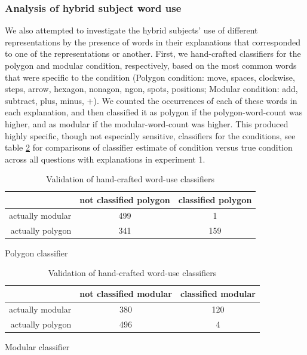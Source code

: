\documentclass[11pt]{article}
\begin{document}
\subsubsection{Analysis of hybrid subject word use}
We also attempted to investigate the hybrid subjects' use of different representations by the presence of words in their explanations that corresponded to one of the representations or another. First, we hand-crafted classifiers for the polygon and modular condition, respectively, based on the most common words that were specific to the condition (Polygon condition: move, spaces, clockwise, steps, arrow, hexagon, nonagon, ngon, spots, positions; Modular condition: add, subtract, plus, minus, +). We counted the occurrences of each of these words in each explanation, and then classified it as polygon if the polygon-word-count was higher, and as modular if the modular-word-count was higher. This produced highly specific, though not especially sensitive, classifiers for the conditions, see table \ref{wordusevaltable} for comparisons of classifier estimate of condition versus true condition across all questions with explanations in experiment 1. 
\begin{table}[h] 
\centering
    \begin{subtable}[c]{\textwidth}
	\centering
	\begin{tabular}{|r|c c|}
	    \hline   & not classified polygon & classified polygon \\ 
	    \hline actually modular & 499 & 1 \\
	    actually polygon & 341 & 159 \\ \hline 
	\end{tabular}
	\caption{Polygon classifier}
    \end{subtable}
    \newline \vspace{1em}\newline 
    \begin{subtable}[c]{\textwidth}
	\centering
	\begin{tabular}{|r|c c|}
	    \hline   & not classified modular & classified modular \\ 
	    \hline actually modular & 380 & 120 \\
	    actually polygon & 496 & 4 \\ \hline 
	\end{tabular}
	\caption{Modular classifier}
    \end{subtable}
\caption{Validation of hand-crafted word-use classifiers}
\label{wordusevaltable}
\end{table} 
\end{document}
